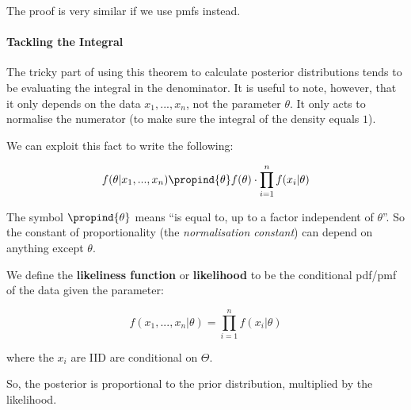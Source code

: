 \documentclass[a4paper]{article}
\begin{document}
                    The proof is very similar if we use pmfs instead.

                \paragraph{Tackling the Integral}
                    The tricky part of using this theorem to calculate posterior
                    distributions tends to be evaluating the integral in the
                    denominator. It is useful to note, however, that it only
                    depends on the data $x_1, ..., x_n$, not the parameter
                    $\theta$. It only acts to normalise the numerator (to make
                    sure the integral of the density equals $1$).

                    We can exploit this fact to write the following:

                    \[
                        f(\theta | x_1, ..., x_n) \propind{\theta}
                        f(\theta) \cdot \prod_{i=1}^n f(x_i | \theta)
                    \]

                    \begin{warn}
                        The symbol $\propind{\theta}$ means ``is equal to, up to
                        a factor independent of $\theta$''. So the constant of
                        proportionality (the \textit{normalisation constant})
                        can depend on anything
                        except $\theta$.
                    \end{warn}

                    \begin{definition}
                        We define the \textbf{likeliness function} or
                        \textbf{likelihood} to be the conditional pdf/pmf of
                        the data given the parameter:

                        \[
                            f(x_1, ..., x_n | \theta) = \prod_{i=1}^n f(x_i |
                            \theta)
                        \]

                        where the $x_i$ are IID are conditional on $\Theta$.

                        So, the posterior is proportional to the prior
                        distribution, multiplied by the likelihood.
                    \end{definition}
\end{document}
